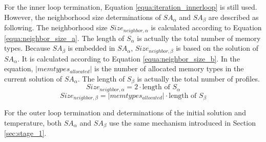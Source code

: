 	For the inner loop termination, Equation \ref{equa:iteration_innerloop} is still used.
	However, the neighborhood size determinations of $SA_{\alpha}$ and $SA_{\beta}$
	are described as following. The neighborhood size
	$Size_{neighbor,\alpha}$ is calculated according to Equation \ref{equa:neighbor_size_a}.
	The length of $S_{\alpha}$ is actually the total number of memory types.
	Because $SA_{\beta}$ is embedded in $SA_{\alpha}$, $Size_{neighbor,\beta}$ is based on
	the solution of $SA_{\alpha}$. It is calculated according to Equation \ref{equa:neighbor_size_b}.
	In the equation, $\lvert memtypes_{allocated} \rvert$ is the number of allocated memory
	types in the current solution of $SA_{\alpha}$. The length of $S_{\beta}$ is actually the
	total number of profiles.
	\begin{equation}
	\label{equa:neighbor_size_a}
		Size_{neighbor,\alpha}=2 \cdot \text{length of } S_{\alpha} 
	\end{equation}
	\begin{equation}
	\label{equa:neighbor_size_b}
		Size_{neighbor,\beta}=\lvert memtypes_{allocated} \rvert \cdot \text{length of } S_{\beta} 
	\end{equation}
	
	For the outer loop termination and determinations of the initial solution and temperature,
	both $SA_{\alpha}$ and $SA_{\beta}$ use the same mechanism introduced in Section
	\ref{sec:stage_1}.
	
	
	
	
	
	